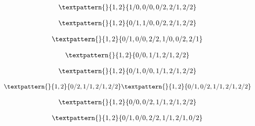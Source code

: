 \begin{equation}
	\begin{gathered}
		\textpattern{}{1,2}{1/0,0/0,0/2,2/1,2/2}
	\end{gathered}
	\label{cls:150}
\end{equation}

\begin{equation}
	\begin{gathered}
		\textpattern{}{1,2}{0/1,1/0,0/2,2/1,2/2}
	\end{gathered}
	\label{cls:151}
\end{equation}

\begin{equation}
	\begin{gathered}
		\textpattern{}{1,2}{0/1,0/0,2/2,1/0,0/2,2/1}
	\end{gathered}
	\label{cls:152}
\end{equation}

\begin{equation}
	\begin{gathered}
		\textpattern{}{1,2}{0/0,1/1,2/1,2/2}
	\end{gathered}
	\label{cls:153}
\end{equation}

\begin{equation}
	\begin{gathered}
		\textpattern{}{1,2}{0/1,0/0,1/1,2/1,2/2}
	\end{gathered}
	\label{cls:154}
\end{equation}

\begin{equation}
	\begin{gathered}
		\textpattern{}{1,2}{0/2,1/1,2/1,2/2}
		\textpattern{}{1,2}{0/1,0/2,1/1,2/1,2/2}
	\end{gathered}
	\label{cls:155}
\end{equation}

\begin{equation}
	\begin{gathered}
		\textpattern{}{1,2}{0/0,0/2,1/1,2/1,2/2}
	\end{gathered}
	\label{cls:156}
\end{equation}

\begin{equation}
	\begin{gathered}
		\textpattern{}{1,2}{0/1,0/0,2/2,1/1,2/1,0/2}
	\end{gathered}
	\label{cls:157}
\end{equation}


